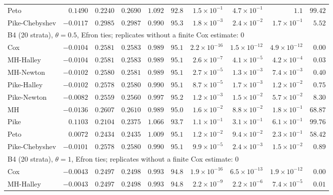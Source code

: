 \begin{landscape}
\begin{longtable}{lrrrrrrrrr}
Peto & $0.1490$ & $0.2240$ & $0.2690$ & $1.092$ & $92.8$ & $1.5 \times 10^{-1}$ & $4.7 \times 10^{-1}$ & $1.1$ & $99.42$ \\
Pike-Chebyshev & $-0.0117$ & $0.2985$ & $0.2987$ & $0.990$ & $95.3$ & $1.8 \times 10^{-3}$ & $2.4 \times 10^{-2}$ & $1.7 \times 10^{-1}$ & $5.52$ \\
\multicolumn{10}{l}{B4 (20 strata), $\theta = 0.5$, Efron ties; replicates without a finite Cox estimate: 0} \\
Cox & $-0.0104$ & $0.2581$ & $0.2583$ & $0.989$ & $95.1$ & $2.2 \times 10^{-16}$ & $1.5 \times 10^{-12}$ & $4.9 \times 10^{-12}$ & $0.00$ \\
MH-Halley & $-0.0104$ & $0.2581$ & $0.2583$ & $0.989$ & $95.1$ & $2.6 \times 10^{-7}$ & $4.1 \times 10^{-5}$ & $4.2 \times 10^{-4}$ & $0.03$ \\
MH-Newton & $-0.0102$ & $0.2580$ & $0.2581$ & $0.989$ & $95.1$ & $2.7 \times 10^{-5}$ & $1.3 \times 10^{-3}$ & $7.4 \times 10^{-3}$ & $0.40$ \\
Pike-Halley & $-0.0102$ & $0.2578$ & $0.2580$ & $0.990$ & $95.1$ & $8.7 \times 10^{-5}$ & $1.7 \times 10^{-3}$ & $1.2 \times 10^{-2}$ & $0.75$ \\
Pike-Newton & $-0.0082$ & $0.2559$ & $0.2560$ & $0.997$ & $95.2$ & $1.2 \times 10^{-3}$ & $1.5 \times 10^{-2}$ & $5.7 \times 10^{-2}$ & $8.30$ \\
MH & $-0.0136$ & $0.2607$ & $0.2610$ & $0.989$ & $95.0$ & $1.6 \times 10^{-2}$ & $8.8 \times 10^{-2}$ & $1.8 \times 10^{-1}$ & $68.87$ \\
Pike & $0.1103$ & $0.2104$ & $0.2375$ & $1.066$ & $93.7$ & $1.1 \times 10^{-1}$ & $3.1 \times 10^{-1}$ & $6.1 \times 10^{-1}$ & $99.76$ \\
Peto & $0.0072$ & $0.2434$ & $0.2435$ & $1.009$ & $95.1$ & $1.2 \times 10^{-2}$ & $9.4 \times 10^{-2}$ & $2.3 \times 10^{-1}$ & $58.42$ \\
Pike-Chebyshev & $-0.0101$ & $0.2578$ & $0.2580$ & $0.990$ & $95.1$ & $9.9 \times 10^{-5}$ & $2.4 \times 10^{-3}$ & $1.5 \times 10^{-2}$ & $0.89$ \\
\multicolumn{10}{l}{B4 (20 strata), $\theta = 1$, Efron ties; replicates without a finite Cox estimate: 0} \\
Cox & $-0.0043$ & $0.2497$ & $0.2498$ & $0.993$ & $94.8$ & $1.9 \times 10^{-16}$ & $6.5 \times 10^{-13}$ & $1.9 \times 10^{-12}$ & $0.00$ \\
MH-Halley & $-0.0043$ & $0.2497$ & $0.2498$ & $0.993$ & $94.8$ & $2.2 \times 10^{-9}$ & $2.2 \times 10^{-6}$ & $7.4 \times 10^{-5}$ & $0.01$ \\

\end{longtable}
\end{landscape}
